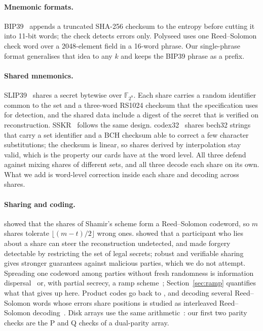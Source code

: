 \documentclass[numeric]{anvil-paper}
\newcommand{\F}{\mathbb{F}}
\begin{document}
\paragraph{Mnemonic formats.}
BIP39~\citep{bip39} appends a truncated SHA-256 checksum to the entropy before
cutting it into 11-bit words; the check detects errors only. Polyseed
\citep{polyseed} uses one Reed--Solomon check word over a 2048-element field in
a 16-word phrase. Our single-phrase format generalises that idea to any $k$ and
keeps the BIP39 phrase as a prefix.

\paragraph{Shared mnemonics.}
SLIP39~\citep{slip39} shares a secret bytewise over $\F_{2^8}$. Each share
carries a random identifier common to the set and a three-word RS1024 checksum
that the specification uses for detection, and the shared data include a
digest of the secret that is verified on reconstruction. SSKR~\citep{sskr}
follows the same design. codex32~\citep{bip93} shares bech32 strings that carry
a set identifier and a BCH checksum able to correct a few character
substitutions; the checksum is linear, so shares derived by interpolation stay
valid, which is the property our cards have at the word level. All three
defend against mixing shares of different sets, and all three decode each
share on its own. What we add is word-level correction inside each share and
decoding across shares.

\paragraph{Sharing and coding.}
\citet{mceliece1981sharing} showed that the shares of Shamir's scheme form a
Reed--Solomon codeword, so $m$ shares tolerate $\lfloor (m-t)/2\rfloor$ wrong
ones. \citet{tompa1989how} showed that a participant who lies about a share can
steer the reconstruction undetected, and made forgery detectable by
restricting the set of legal secrets; robust and verifiable sharing
\citep{rabin1989verifiable} gives stronger guarantees against malicious
parties, which we do not attempt. Spreading one codeword among parties without
fresh randomness is information dispersal~\citep{rabin1989efficient} or, with
partial secrecy, a ramp scheme~\citep{blakley1985security,
franklin1992communication}; Section~\ref{sec:ramp} quantifies what that gives
up here. Product codes go back to \citet{elias1954error}, and decoding several
Reed--Solomon words whose errors share positions is studied as interleaved
Reed--Solomon decoding~\citep{schmidt2009collaborative}. Disk arrays use the
same arithmetic~\citep{patterson1988case, plank1997tutorial}: our first two
parity checks are the P and Q checks of a dual-parity array.
\end{document}
